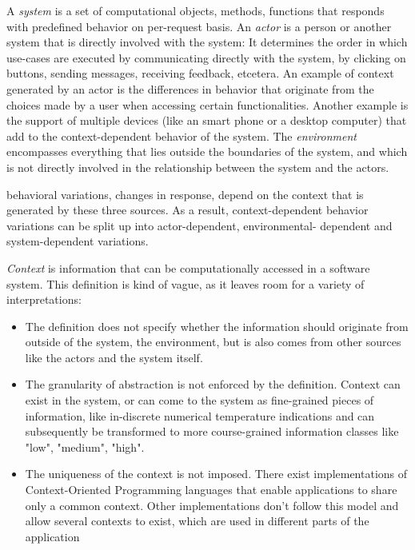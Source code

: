 \documentclass{acm_proc_article-sp}
\begin{document}
A \textit{system} is a set of computational objects, methods, functions that responds with predefined behavior on per-request basis. An \textit{actor} is a person or another system that is directly involved with the system: It determines the order in which use-cases are executed by communicating directly with the system, by clicking on buttons, sending messages, receiving feedback, etcetera. An example of context generated by an actor is the differences in behavior that originate from the choices made by a user when accessing certain functionalities. Another example is the support of multiple devices (like an smart phone or a desktop computer) that add to the context-dependent behavior of the system. The \textit{environment} encompasses everything that lies outside the boundaries of the system, and which is not directly involved in the relationship between the system and the actors.

behavioral variations, changes in response, depend on the context that is generated by these three sources. As a result, context-dependent behavior variations can be split up into actor-dependent, environmental- dependent and  system-\linebreak dependent variations.

\textit{Context} is information that can be computationally accessed in a software system. This definition is kind of vague, as it leaves room for a variety of interpretations: 
\begin{itemize}
\item The definition does not specify whether the information should originate from outside of the system, the environment, but is also comes from other sources like the actors and the system itself.
\item The granularity of abstraction is not enforced by the definition. Context can exist in the system, or can come to the system as fine-grained pieces of information, like in-discrete numerical temperature indications and can subsequently be transformed to more course-grained information classes like "low", "medium", "high". 
\item The uniqueness of the context is not imposed. There exist implementations of Context-Oriented Programming languages that enable applications to share only a common context. Other implementations don't follow this model and allow several contexts to exist, which are used in different parts of the application \cite{Appeltauer:2009:CCP:1562112.1562118}
\end{itemize}
\end{document}
